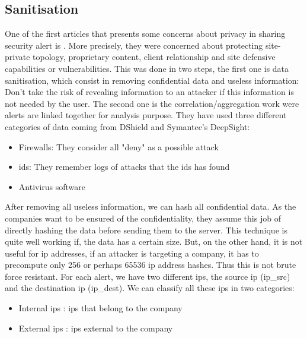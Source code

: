 \documentclass{eplmastersthesis}
\begin{document}
\subsection{Sanitisation}
One of the first articles that presents some concerns about privacy in sharing security alert is \cite{lincoln2004privacy}.
More precisely, they were concerned about protecting site-private topology, proprietary content, client relationship and site defensive capabilities or vulnerabilities.
This was done in two steps, the first one is data sanitisation, which consist in removing confidential data and useless information: Don't take the risk of revealing information to an attacker if this information is not needed by the user.
The second one is the correlation/aggregation work were alerts are linked together for analysis purpose.
 They have used three different categories of data coming from DShield and Symantec's DeepSight:
\begin{itemize}
\item Firewalls: They consider all "deny" as a possible attack
\item \gls{ids}: They remember logs of attacks that the \gls{ids} has found
\item Antivirus software
\end{itemize}

After removing all useless information, we can hash all confidential data. As the companies want to be ensured of the confidentiality, they assume this job of directly hashing the data before sending them to the server.
This technique is quite well working if, the data has a certain size. But, on the other hand, it is not useful for \gls{ip} addresses, if an attacker is targeting a company, it has to precompute only 256 or perhaps 65536 \gls{ip} address hashes. Thus this is not brute force resistant.
For each alert, we have two different \gls{ip}s, the source \gls{ip} (ip\_src) and the destination \gls{ip} (ip\_dest). We can classify all these \gls{ip}s in two categories:
\begin{itemize}
	\item Internal \gls{ip}s : \gls{ip}s that belong to the company
	\item External \gls{ip}s : \gls{ip}s external to the company
\end{itemize}
\end{document}
